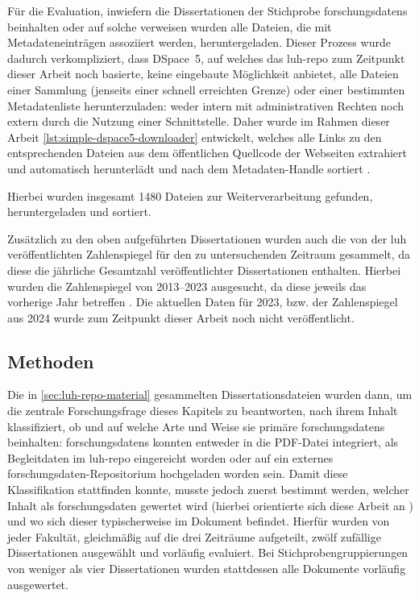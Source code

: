 Für die Evaluation, inwiefern die Dissertationen der Stichprobe \glspl{forschungsdaten} beinhalten oder auf solche verweisen wurden alle Dateien, die mit Metadateneinträgen assoziiert werden, heruntergeladen.
Dieser Prozess wurde dadurch verkompliziert, dass DSpace~5, auf welches das \gls{luh-repo} zum Zeitpunkt dieser Arbeit noch basierte, keine eingebaute Möglichkeit anbietet, alle Dateien einer Sammlung (jenseits einer schnell erreichten Grenze) oder einer bestimmten Metadatenliste herunterzuladen:
weder intern mit administrativen Rechten noch extern durch die Nutzung einer Schnittstelle.
Daher wurde im Rahmen dieser Arbeit \cref{lst:simple-dspace5-downloader} entwickelt, welches alle Links zu den entsprechenden Dateien aus dem öffentlichen Quellcode der Webseiten extrahiert und automatisch herunterlädt und nach dem Metadaten-Handle sortiert \autocite{Krassnig2024-dspace}.

Hierbei wurden insgesamt \num{1480} Dateien zur Weiterverarbeitung gefunden, heruntergeladen und sortiert.

Zusätzlich zu den oben aufgeführten Dissertationen wurden auch die von der \gls{luh} veröffentlichten Zahlenspiegel für den zu untersuchenden Zeitraum gesammelt, da diese die jährliche Gesamtzahl veröffentlichter Dissertationen enthalten.
Hierbei wurden die Zahlenspiegel von 2013--2023 ausgesucht, da diese jeweils das vorherige Jahr betreffen \autocite{Zahlenspiegel2013,Zahlenspiegel2014,Zahlenspiegel2015,Zahlenspiegel2016,Zahlenspiegel2017,Zahlenspiegel2018,Zahlenspiegel2019,Zahlenspiegel2020,Zahlenspiegel2021,Zahlenspiegel2022,Zahlenspiegel2023}.
Die aktuellen Daten für 2023, bzw. der Zahlenspiegel aus 2024 wurde zum Zeitpunkt dieser Arbeit noch nicht veröffentlicht.

\subsection{Methoden}\label{sec:luh-repo-methods}
Die in \cref{sec:luh-repo-material} gesammelten Dissertationsdateien wurden dann, um die zentrale Forschungsfrage dieses Kapitels zu beantworten, nach ihrem Inhalt klassifiziert, ob und auf welche Arte und Weise sie primäre \glspl{forschungsdaten} beinhalten:
\glspl{forschungsdaten} konnten entweder in die PDF-Datei integriert, als Begleitdaten im \gls{luh-repo} eingereicht worden oder auf ein externes \gls{forschungsdaten}-Repositorium hochgeladen worden sein.
Damit diese Klassifikation stattfinden konnte, musste jedoch zuerst bestimmt werden, welcher Inhalt als \gls{forschungsdaten} gewertet wird (hierbei orientierte sich diese Arbeit an \autocite{dfg-richtlinie,Simukovic2014InterviewFD}) und wo sich dieser typischerweise im Dokument befindet.
Hierfür wurden von jeder Fakultät, gleichmäßig auf die drei Zeiträume aufgeteilt, zwölf zufällige Dissertationen ausgewählt und vorläufig evaluiert.
Bei Stichprobengruppierungen von weniger als vier Dissertationen wurden stattdessen alle Dokumente vorläufig ausgewertet.

